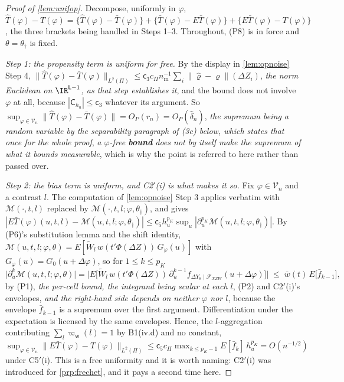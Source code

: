 \begin{proof}[Proof of \cref{lem:unifop}]
Decompose, uniformly in $\varphi$,
$\hat T(\varphi)-T(\varphi)=\{\hat T(\varphi)-\bar T(\varphi)\}+\{\bar T(\varphi)-E\bar T(\varphi)\}+\{E\bar T(\varphi)-T(\varphi)\}$,
the three brackets being handled in Steps 1--3. Throughout, (P8) is in force and
$\theta=\theta_\dagger$ is fixed.

\emph{Step 1: the propensity term is uniform for free.} By the display in \cref{lem:opnoise} Step 4,
$\|\hat T(\varphi)-\bar T(\varphi)\|_{L^{2}(\Pi)}\le\mathsf c_3c_\Pi n_{\mathrm m}^{-1}\sum_i\|\hat\varrho-\varrho\|(\Delta Z_i)$,
\emph{the norm Euclidean on $\IR^{\mathsf L-1}$, as that step establishes it},
and the bound does not involve $\varphi$ at all, because $|\mathsf C_{h_u}|\le\mathsf c_3$ whatever its
argument. So $\sup_{\varphi\in\mathcal V_n}\|\hat T(\varphi)-\bar T(\varphi)\|=O_P(r_n)=O_P(\hat\delta_n)$,
\emph{the supremum being a random variable by the separability paragraph of \textup{(3c)} below, which states
that once for the whole proof}, \emph{a $\varphi$-free \textbf{bound} does not by itself make the supremum
of what it bounds measurable}, which is why the point is referred to here rather than passed over.

\emph{Step 2: the bias term is uniform, and C2$'$(i) is what makes it so.} Fix $\varphi\in\mathcal V_n$
and a contrast $l$.
The computation of \cref{lem:opnoise} Step 3 applies verbatim with $\mathcal M(\cdot,t,l)$ replaced by
$\mathcal M(\cdot,t,l;\varphi,\theta_\dagger)$, and gives
$|E\bar T(\varphi)(u,t,l)-\mathcal M(u,t,l;\varphi,\theta_\dagger)|\le\mathsf c_5h_u^{p_K}\sup_u|\partial_u^{p_K}\mathcal M(u,t,l;\varphi,\theta_\dagger)|$.
By (P6)'s substitution lemma and the shift identity,
$\mathcal M(u,t,l;\varphi,\theta)=E[\widetilde W_l\,w(t'\Phi(\Delta Z))\,G_{\varphi}(u)]$ with
$G_\varphi(u)=G_{0}(u+\Delta\varphi)$, so for $1\le k\le p_K$
\[
\big|\partial_u^{k}\mathcal M(u,t,l;\varphi,\theta)\big|
=\Big|E\Big[\widetilde W_l\,w(t'\Phi(\Delta Z))\,\partial_u^{k-1}f_{\Delta Y_\theta\mid\mathcal F_{XZW}}(u+\Delta\varphi)\Big]\Big|
\;\le\;\bar w(t)\,E\big[\bar f_{k-1}\big],
\]
by (P1), \emph{the per-cell bound, the integrand being scalar at each $l$}, (P2) and C2$'$(i)'s
envelopes, \emph{and the right-hand side depends on neither $\varphi$ nor $l$},
because the envelope $\bar f_{k-1}$ is a supremum over the first argument. Differentiation under the
expectation is licensed by the same envelopes. Hence, the $l$-aggregation contributing
$\sum_l\varpi_{\mathsf w}(l)=1$ by B1(iv.d) and no constant,
$\sup_{\varphi\in\mathcal V_n}\|E\bar T(\varphi)-T(\varphi)\|_{L^{2}(\Pi)}\le\mathsf c_5c_\Pi\max_{k\le p_K-1}E[\bar f_k]\,h_u^{p_K}=O(n^{-1/2})$
under C5$'$(i). This is a free uniformity and it is worth naming: C2$'$(i) was introduced for
\cref{prp:frechet}, and it pays a second time here.


\end{proof}

